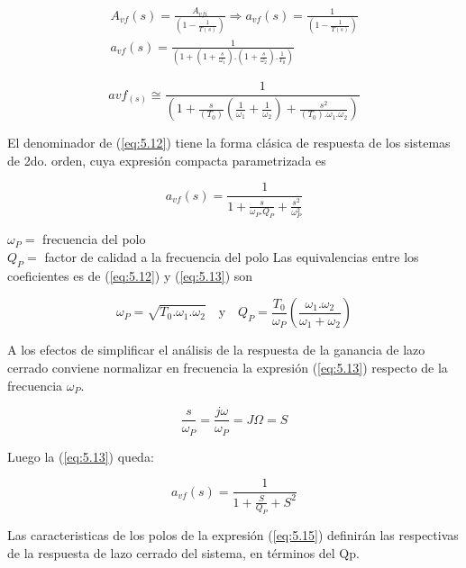 \begin{gather*}
    A_{vf}(s) = \frac{A_{vfi}}{\left( 1 - \frac{1}{T(s)} \right)} \Rightarrow a_{vf}(s) = \frac{1}{\left( 1 - \frac{1}{T(s)} \right)} \\
    a_{vf}(s) = \frac{1}{\left( 1 + \left( 1 + \frac{s}{\omega_1} \right).\left( 1 + \frac{s}{\omega_2} \right) . \frac{1}{T_0} \right)}
\end{gather*}

\begin{equation}
    avf_{(s)} \cong \frac{1}{\left( 1 + \frac{s}{(T_0)}\left(\frac{1}{\omega_1} + \frac{1}{\omega_2}\right) + \frac{s^2}{(T_0).\omega_1.\omega_2} \right)} \tag{5.12} \label{eq:5.12}
\end{equation}

El denominador de (\ref{eq:5.12}) tiene la forma clásica de respuesta de los sistemas de 2do. orden, cuya expresión compacta parametrizada es

\begin{equation}
    a_{vf}(s) = \frac{1}{1 + \frac{s}{\omega_P.Q_P} + \frac{s^2}{\omega_P^2}} \tag{5.13} \label{eq:5.13}
\end{equation}

$\omega_P =$ frecuencia del polo \\
$Q_P =$ factor de calidad a la frecuencia del polo
Las equivalencias entre los coeficientes es de (\ref{eq:5.12}) y (\ref{eq:5.13}) son

\begin{equation}
    \omega_P = \sqrt{T_0.\omega_1.\omega_2} \quad \text{y} \quad Q_P = \frac{T_0}{\omega_P} \left( \frac{\omega_1.\omega_2}{\omega_1 + \omega_2} \right) \tag{5.14} \label{eq:5.14}
\end{equation}

A los efectos de simplificar el análisis de la respuesta de la ganancia de lazo cerrado conviene normalizar en frecuencia la expresión (\ref{eq:5.13}) respecto de la frecuencia $\omega_P$.

\begin{equation*}
    \frac{s}{\omega_P} = \frac{j\omega}{\omega_P} = J\Omega = S
\end{equation*}

Luego la (\ref{eq:5.13}) queda:

\begin{equation}
    a_{vf}(s) = \frac{1}{1 + \frac{S}{Q_P} + S^2} \tag{5.15} \label{eq:5.15}
\end{equation}

Las caracteristicas de los polos de la expresión (\ref{eq:5.15}) definirán las respectivas de la respuesta de lazo cerrado del sistema, en términos del Qp.

